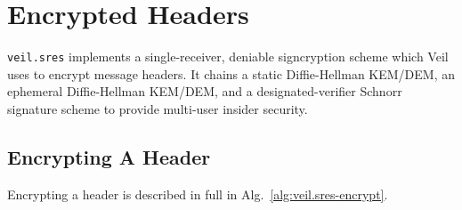 \section{Encrypted Headers}\label{sec:veil.sres}

\texttt{veil.sres} implements a single-receiver, deniable signcryption scheme which Veil uses to encrypt message
headers.
It chains a static Diffie-Hellman KEM/DEM, an ephemeral Diffie-Hellman KEM/DEM, and a designated-verifier Schnorr
signature scheme to provide multi-user insider security.

\subsection{Encrypting A Header}\label{subsec:veil.sres-encrypt}

Encrypting a header is described in full in Alg.~\ref{alg:veil.sres-encrypt}.

